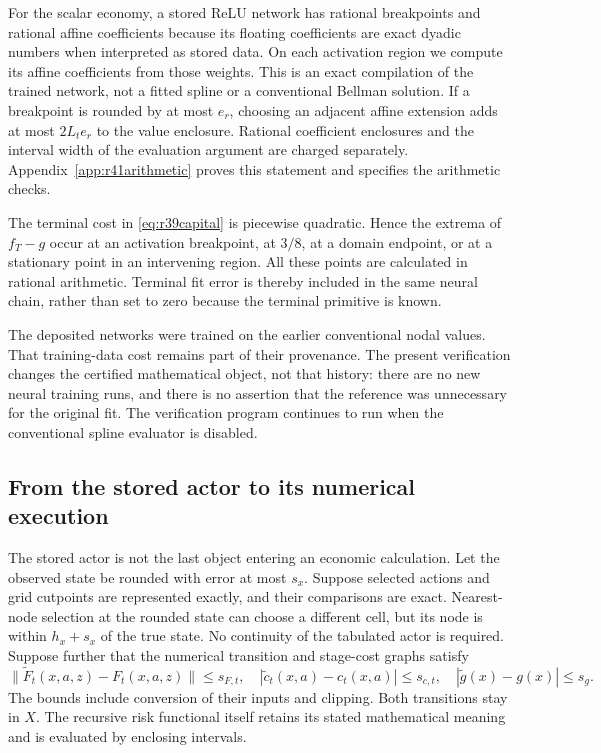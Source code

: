 For the scalar economy, a stored ReLU network has rational breakpoints and
rational affine coefficients because its floating coefficients are exact
dyadic numbers when interpreted as stored data. On each activation region
we compute its affine coefficients from those weights. This is an exact
compilation of the trained network, not a fitted spline or a conventional
Bellman solution. If a breakpoint is rounded by at most $e_r$, choosing an
adjacent affine extension adds at most $2L_te_r$ to the value enclosure.
Rational coefficient enclosures and the interval width of the evaluation
argument are charged separately. Appendix~\ref{app:r41arithmetic} proves
this statement and specifies the arithmetic checks.

The terminal cost in \eqref{eq:r39capital} is piecewise quadratic. Hence the
extrema of $f_T-g$ occur at an activation breakpoint, at $3/8$, at a domain
endpoint, or at a stationary point in an intervening region. All these
points are calculated in rational arithmetic. Terminal fit error is thereby
included in the same neural chain, rather than set to zero because the
terminal primitive is known.

The deposited networks were trained on the earlier conventional nodal
values. That training-data cost remains part of their provenance. The present
verification changes the certified mathematical object, not that history:
there are no new neural training runs, and there is no assertion that the
reference was unnecessary for the original fit. The verification program
continues to run when the conventional spline evaluator is disabled.

\subsection{From the stored actor to its numerical execution}
\label{sec:r41deployment}
The stored actor is not the last object entering an economic calculation.
Let the observed state be rounded with error at most $s_x$. Suppose selected
actions and grid cutpoints are represented exactly, and their comparisons
are exact. Nearest-node selection at the rounded state can choose a different
cell, but its node is within $h_x+s_x$ of the true state. No continuity of
the tabulated actor is required. Suppose further that the numerical
transition and stage-cost graphs satisfy
\[
 \|\widetilde F_t(x,a,z)-F_t(x,a,z)\|\leq s_{F,t},\quad
 |\widetilde c_t(x,a)-c_t(x,a)|\leq s_{c,t},\quad
 |\widetilde g(x)-g(x)|\leq s_g.
\]
The bounds include conversion of their inputs and clipping. Both transitions
stay in $X$. The recursive risk functional itself retains its stated
mathematical meaning and is evaluated by enclosing intervals.

